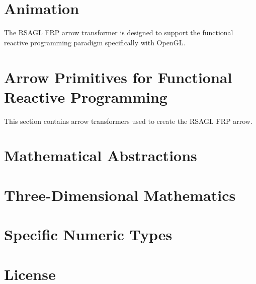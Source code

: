 \documentclass[pdftex]{article}
\begin{document}
\part{Animation}

The RSAGL FRP arrow transformer is designed to support the functional reactive programming paradigm
specifically with OpenGL.











\part{Arrow Primitives for Functional Reactive Programming}

This section contains arrow transformers used to create the RSAGL FRP arrow.







\part{Mathematical Abstractions}






\part{Three-Dimensional Mathematics}











\part{Specific Numeric Types}




\part{License}


\end{document}
